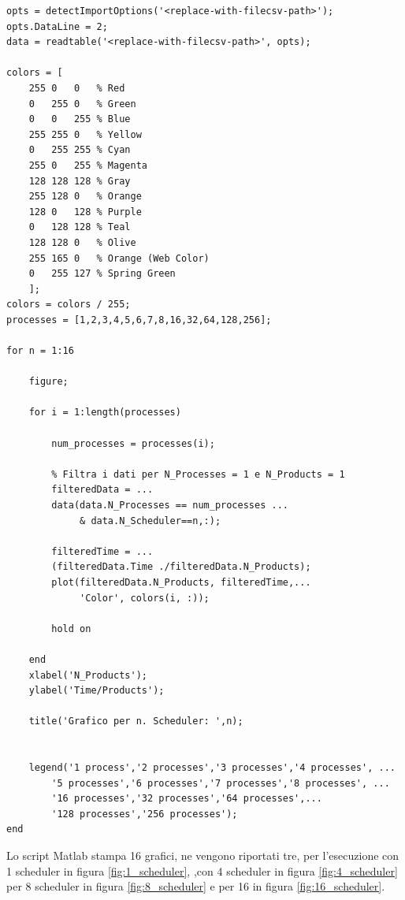 \begin{lstlisting}[language=none,captionpos=b,
	caption={Codice Matlab per la stampa dei grafici},label={lst:analisi_matlab}]
opts = detectImportOptions('<replace-with-filecsv-path>');
opts.DataLine = 2;
data = readtable('<replace-with-filecsv-path>', opts);

colors = [
    255 0   0   % Red
    0   255 0   % Green
    0   0   255 % Blue
    255 255 0   % Yellow
    0   255 255 % Cyan
    255 0   255 % Magenta
    128 128 128 % Gray
    255 128 0   % Orange
    128 0   128 % Purple
    0   128 128 % Teal
    128 128 0   % Olive
    255 165 0   % Orange (Web Color)
    0   255 127 % Spring Green
    ];
colors = colors / 255;
processes = [1,2,3,4,5,6,7,8,16,32,64,128,256];

for n = 1:16

    figure;

    for i = 1:length(processes)

        num_processes = processes(i);

        % Filtra i dati per N_Processes = 1 e N_Products = 1
        filteredData = ... 
		data(data.N_Processes == num_processes ... 
		     & data.N_Scheduler==n,:);

        filteredTime = ... 
		(filteredData.Time ./filteredData.N_Products);
        plot(filteredData.N_Products, filteredTime,... 
		     'Color', colors(i, :));

        hold on

    end
    xlabel('N_Products');
    ylabel('Time/Products');

    title('Grafico per n. Scheduler: ',n);


    legend('1 process','2 processes','3 processes','4 processes', ...
        '5 processes','6 processes','7 processes','8 processes', ...
        '16 processes','32 processes','64 processes',... 
        '128 processes','256 processes');
end
\end{lstlisting}

Lo script Matlab stampa 16 grafici, ne vengono riportati
tre, per l'esecuzione con 1 scheduler in figura \ref{fig:1_scheduler},
,con 4 scheduler in figura \ref{fig:4_scheduler} per 8 scheduler in figura \ref{fig:8_scheduler}
e per 16 in figura \ref{fig:16_scheduler}.

